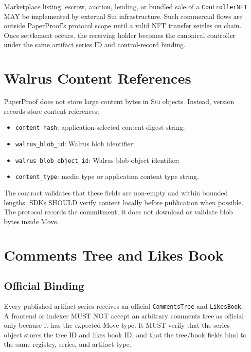 \documentclass[11pt]{article}
\newcommand{\code}[1]{\texttt{#1}}
\newcommand{\sui}{\textsc{Sui}}
\begin{document}
Marketplace listing, escrow, auction, lending, or bundled sale of a
\code{ControllerNFT} MAY be implemented by external Sui infrastructure. Such
commercial flows are outside PaperProof's protocol scope until a valid NFT
transfer settles on chain. Once settlement occurs, the receiving holder becomes
the canonical controller under the same artifact series ID and control-record
binding.

\section{Walrus Content References}

PaperProof does not store large content bytes in \sui{} objects. Instead, version records store content references:

\begin{itemize}[leftmargin=*]
  \item \code{content\_hash}: application-selected content digest string;
  \item \code{walrus\_blob\_id}: Walrus blob identifier;
  \item \code{walrus\_blob\_object\_id}: Walrus blob object identifier;
  \item \code{content\_type}: media type or application content type string.
\end{itemize}

The contract validates that these fields are non-empty and within bounded lengths. SDKs SHOULD verify content locally before publication when possible. The protocol records the commitment; it does not download or validate blob bytes inside Move.

\section{Comments Tree and Likes Book}

\subsection{Official Binding}

Every published artifact series receives an official \code{CommentsTree} and \code{LikesBook}. A frontend or indexer MUST NOT accept an arbitrary comments tree as official only because it has the expected Move type. It MUST verify that the series object stores the tree ID and likes book ID, and that the tree/book fields bind to the same registry, series, and artifact type.
\end{document}
